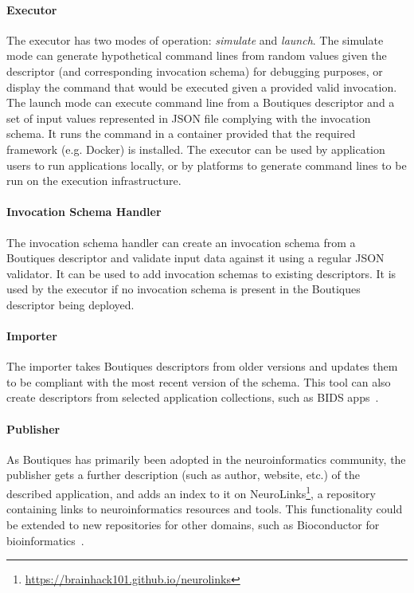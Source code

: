 \documentclass[a4paper,num-refs]{oup-contemporary}
\newcommand{\boutiques}{Boutiques\xspace}
\begin{document}
\paragraph{Executor} The executor has two modes of operation: \emph{simulate} and \emph{launch}. The simulate mode can generate hypothetical command lines from
random values given the descriptor (and corresponding invocation
schema) for debugging purposes, or display the command that would be
executed given a provided valid invocation. The launch mode can
execute command line from a \boutiques descriptor and a set of input
values represented in JSON file complying with the invocation schema.
It runs the command in a container provided that the required
framework (e.g. Docker) is installed. The executor can be used
by application users to run applications locally, or by platforms to
generate command lines to be run on the execution infrastructure.

\paragraph{Invocation Schema Handler} The invocation schema handler can create an
invocation schema from a \boutiques descriptor and validate input data
against it using a regular JSON validator. It can be used to add
invocation schemas to existing descriptors. It is used by the executor
if no invocation schema is present in the \boutiques descriptor being
deployed.

\paragraph{Importer} The importer takes \boutiques descriptors from older versions and
updates them to be compliant with the most recent version of the schema. This tool can
also create descriptors from selected application collections, such as BIDS
apps~\cite{gorgolewski2017bids}.

\paragraph{Publisher} As \boutiques has primarily been adopted in the neuroinformatics
community, the publisher gets a further description (such as author,
website, etc.) of the described application, and adds an index to it
on
NeuroLinks\footnote{\url{https://brainhack101.github.io/neurolinks}},
a repository containing links to neuroinformatics resources and
tools. This functionality could be extended to new repositories for
other domains, such as Bioconductor for
bioinformatics~\cite{gentleman2004bioconductor}.
\end{document}
